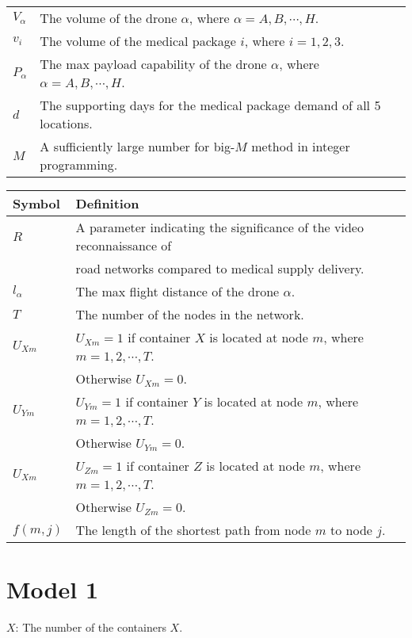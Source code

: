 \documentclass{mcmthesis}
\begin{document}
\begin{tabular}{ll}
	 $V_\alpha$& The volume of the drone $\alpha$, where $\alpha=A,B,\cdots,H$.\\
	
	 $v_i$& The volume of the medical package $i$, where $i=1,2,3$.\\
	
	 $P_\alpha$& The max payload capability of the drone $\alpha$, where $\alpha=A,B,\cdots,H$.\\
	
	 $d$& The supporting days for the medical package demand of all 5 locations.\\
	
	 $M$& A sufficiently large number for big-$M$ method in integer programming.\\ 
	\hline
\end{tabular}


\begin{tabular}{ll}
	\hline
	Symbol&  Definition\\
	\hline	 
	 $R$& A parameter indicating the significance of the video reconnaissance of\\
	 & road networks compared to medical supply delivery. \\
	 
	 $l_\alpha$& The max flight distance of the drone $\alpha$.\\
	 
	 $T$& The number of the nodes in the network.\\
	 
	 $U_{Xm}$& $U_{Xm}=1$ if container $X$ is located at node $m$, where $m=1,2,\cdots,T$.\\ & Otherwise $U_{Xm}=0$.\\
	 
	 $U_{Ym}$& $U_{Ym}=1$ if container $Y$ is located at node $m$, where $m=1,2,\cdots,T$.\\ &Otherwise $U_{Ym}=0$.\\
	 
	 $U_{Xm}$& $U_{Zm}=1$ if container $Z$ is located at node $m$, where $m=1,2,\cdots,T$.\\ &Otherwise $U_{Zm}=0$.\\
	 
	$f(m,j)$& The length of the shortest path from node $m$ to node $j$.\\
	\hline
\end{tabular}

\section{Model 1}
\noindent $X$: The number of the containers $X$.
\end{document}
